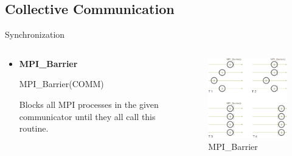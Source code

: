 \subsection{Collective Communication}

\begin{frame}{Synchronization}
    \begin{columns}
        \begin{column}{.5\textwidth}
        
            \begin{itemize}
                \item \textbf{MPI\_Barrier}

                MPI\_Barrier(COMM)

                Blocks all MPI processes in the given communicator until they all call this routine.
            \end{itemize}
        \end{column}

        \begin{column}{.5\textwidth}
            \begin{figure}
                \centering
                \includegraphics[width=0.7\linewidth]{day8_am/img/mpi/barrier.png}
                \caption{MPI\_Barrier}
                \label{fig:barrier}
            \end{figure}
        \end{column}
    \end{columns}
\end{frame}

